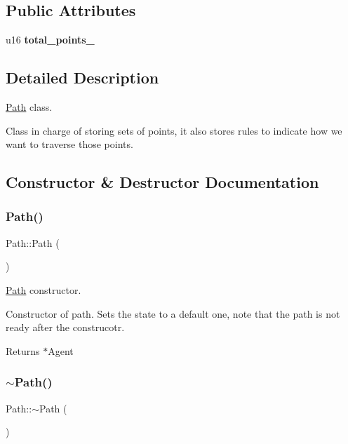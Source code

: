 \subsection*{Public Attributes}
\begin{DoxyCompactItemize}
\item 
\mbox{\label{class_path_a7cb1f774525b1c0a68dac6e01dc10121}} 
u16 {\bfseries total\+\_\+points\+\_\+}
\end{DoxyCompactItemize}


\subsection{Detailed Description}
\mbox{\hyperlink{class_path}{Path}} class. 

Class in charge of storing sets of points, it also stores rules to indicate how we want to traverse those points. 

\subsection{Constructor \& Destructor Documentation}
\mbox{\label{class_path_af26cfab021ddf49af73da3b2beca85ac}} 
\subsubsection{\texorpdfstring{Path()}{Path()}}
{\footnotesize\ttfamily Path\+::\+Path (\begin{DoxyParamCaption}{ }\end{DoxyParamCaption})}



\mbox{\hyperlink{class_path}{Path}} constructor. 

Constructor of path. Sets the state to a default one, note that the path is not ready after the construcotr.

\begin{DoxyReturn}{Returns}
$\ast$\+Agent 
\end{DoxyReturn}
\mbox{\label{class_path_a141da9ff89c85e0ba410b5a73864c267}} 
\subsubsection{\texorpdfstring{$\sim$\+Path()}{~Path()}}
{\footnotesize\ttfamily Path\+::$\sim$\+Path (\begin{DoxyParamCaption}{ }\end{DoxyParamCaption})}



